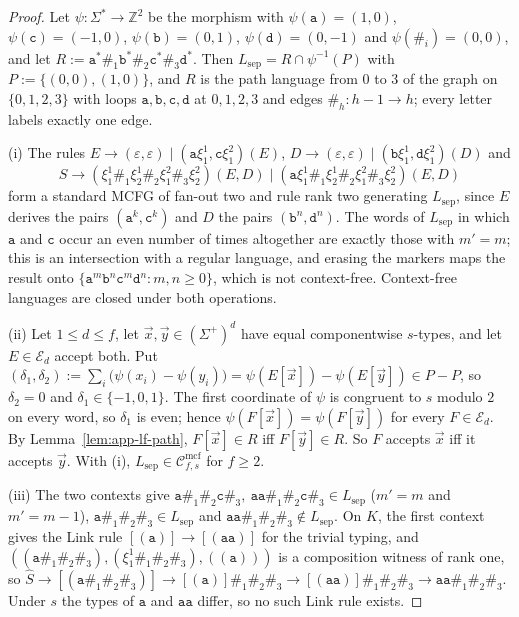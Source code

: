 \documentclass[11pt]{article}
\numberwithin{equation}{section}
\theoremstyle{plain}
\theoremstyle{definition}
\theoremstyle{remark}
\newcommand{\Cmcf}[2]{\mathcal{C}^{\mathrm{mcf}}_{#1,#2}}
\newcommand{\tuple}[1]{\vec{#1}}
\newcommand{\eps}{\varepsilon}
\theoremstyle{plain}
\begin{document}
\begin{proof}
Let $\psi:\Sigma^*\to\mathbb Z^2$ be the morphism with $\psi(\mathtt a)=(1,0)$,
$\psi(\mathtt c)=(-1,0)$, $\psi(\mathtt b)=(0,1)$, $\psi(\mathtt d)=(0,-1)$ and
$\psi(\mathtt\#_i)=(0,0)$, and let
$R:=\mathtt a^*\mathtt\#_1\mathtt b^*\mathtt\#_2\mathtt c^*\mathtt\#_3\mathtt d^*$.  Then
$L_{\mathrm{sep}}=R\cap\psi^{-1}(P)$ with $P:=\{(0,0),(1,0)\}$, and $R$ is the path language
from $0$ to $3$ of the graph on $\{0,1,2,3\}$ with loops $\mathtt a,\mathtt b,\mathtt c,\mathtt d$
at $0,1,2,3$ and edges $\mathtt\#_h:h-1\to h$; every letter labels exactly one edge.

(i) The rules $E\to(\eps,\eps)\mid(\mathtt a\xi_1^1,\mathtt c\xi_1^2)(E)$,
$D\to(\eps,\eps)\mid(\mathtt b\xi_1^1,\mathtt d\xi_1^2)(D)$ and
\[
 S\to(\xi_1^1\mathtt\#_1\xi_2^1\mathtt\#_2\xi_1^2\mathtt\#_3\xi_2^2)(E,D)\mid
 (\mathtt a\xi_1^1\mathtt\#_1\xi_2^1\mathtt\#_2\xi_1^2\mathtt\#_3\xi_2^2)(E,D)
\]
form a standard MCFG of fan-out two and rule rank two generating $L_{\mathrm{sep}}$, since $E$
derives the pairs $(\mathtt a^k,\mathtt c^k)$ and $D$ the pairs $(\mathtt b^n,\mathtt d^n)$.
The words of $L_{\mathrm{sep}}$ in which $\mathtt a$ and $\mathtt c$ occur an even number of
times altogether are exactly those with $m'=m$; this is an intersection with a regular
language, and erasing the markers maps the result onto
$\{\mathtt a^m\mathtt b^n\mathtt c^m\mathtt d^n:m,n\ge0\}$, which is not context-free.  Context-free
languages are closed under both operations.

(ii) Let $1\le d\le f$, let $\tuple x,\tuple y\in(\Sigma^+)^d$ have equal componentwise
$s$-types, and let $E\in\mathcal E_d$ accept both.  Put
$(\delta_1,\delta_2):=\sum_i\bigl(\psi(x_i)-\psi(y_i)\bigr)=\psi(E[\tuple x])-\psi(E[\tuple y])
\in P-P$, so $\delta_2=0$ and $\delta_1\in\{-1,0,1\}$.  The first coordinate of $\psi$ is
congruent to $s$ modulo $2$ on every word, so $\delta_1$ is even; hence
$\psi(F[\tuple x])=\psi(F[\tuple y])$ for every $F\in\mathcal E_d$.  By
Lemma~\ref{lem:app-lf-path}, $F[\tuple x]\in R$ iff $F[\tuple y]\in R$.  So $F$ accepts
$\tuple x$ iff it accepts $\tuple y$.  With (i), $L_{\mathrm{sep}}\in\Cmcf{f}{s}$ for $f\ge2$.

(iii) The two contexts give
$\mathtt a\mathtt\#_1\mathtt\#_2\mathtt c\mathtt\#_3,\
\mathtt a\mathtt a\mathtt\#_1\mathtt\#_2\mathtt c\mathtt\#_3\in L_{\mathrm{sep}}$ ($m'=m$ and
$m'=m-1$), $\mathtt a\mathtt\#_1\mathtt\#_2\mathtt\#_3\in L_{\mathrm{sep}}$ and
$\mathtt a\mathtt a\mathtt\#_1\mathtt\#_2\mathtt\#_3\notin L_{\mathrm{sep}}$.  On $K$, the first
context gives the Link rule $[(\mathtt a)]\to[(\mathtt a\mathtt a)]$ for the trivial typing,
and $((\mathtt a\mathtt\#_1\mathtt\#_2\mathtt\#_3),(\xi_1^1\mathtt\#_1\mathtt\#_2\mathtt\#_3),
((\mathtt a)))$ is a composition witness of rank one, so
$\widehat S\to[(\mathtt a\mathtt\#_1\mathtt\#_2\mathtt\#_3)]\to[(\mathtt a)]\mathtt\#_1\mathtt\#_2
\mathtt\#_3\to[(\mathtt a\mathtt a)]\mathtt\#_1\mathtt\#_2\mathtt\#_3\to
\mathtt a\mathtt a\mathtt\#_1\mathtt\#_2\mathtt\#_3$.  Under $s$ the types of $\mathtt a$ and
$\mathtt a\mathtt a$ differ, so no such Link rule exists.
\end{proof}
\end{document}
